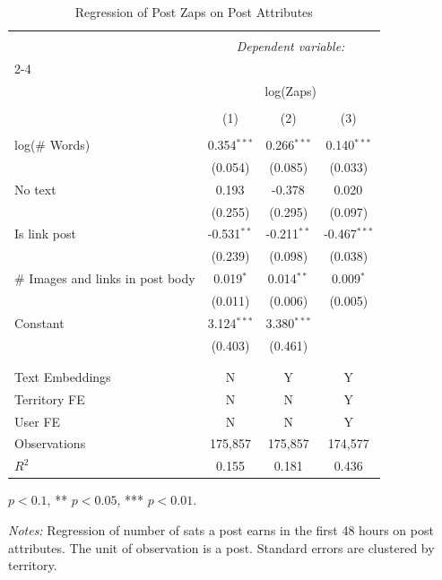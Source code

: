 \begin{table}[H]
\centering
\caption{Regression of Post Zaps on Post Attributes} \label{tbl_v4v_zreg}
\begin{threeparttable}
\begin{tabular}{@{\extracolsep{5pt}}lccc} 
\\[-1.8ex]\hline 
\hline \\[-1.8ex] 
 & \multicolumn{3}{c}{\textit{Dependent variable:}} \\ 
\cline{2-4} 
\\[-1.8ex] & \multicolumn{3}{c}{log(Zaps)} \\ 
\\[-1.8ex] & (1) & (2) & (3) \\ 
\hline \\[-1.8ex] 
log(\# Words)  & 0.354$^{***}$ & 0.266$^{***}$ & 0.140$^{***}$ \\
 & (0.054) & (0.085) & (0.033) \\
No text  & 0.193$^{}$ & -0.378$^{}$ & 0.020$^{}$ \\
 & (0.255) & (0.295) & (0.097) \\
Is link post  & -0.531$^{**}$ & -0.211$^{**}$ & -0.467$^{***}$ \\
 & (0.239) & (0.098) & (0.038) \\
\# Images and links in post body  & 0.019$^{*}$ & 0.014$^{**}$ & 0.009$^{*}$ \\
 & (0.011) & (0.006) & (0.005) \\
Constant  & 3.124$^{***}$ & 3.380$^{***}$ &  \\
 & (0.403) & (0.461) &  \\
& & & \\
\hline \\ [-1.8ex]
Text Embeddings         & N & Y & Y \\
Territory FE            & N & N & Y \\
User FE                 & N & N & Y \\
Observations  & 175,857 & 175,857 & 174,577 \\
$R^2$  & 0.155 & 0.181 & 0.436 \\ \hline \hline 
\end{tabular} 
\begin{tablenotes}[flushleft]\footnotesize
\item[] \parbox[t]{\linewidth}{%
\hfill * $p<0.1$, ** $p<0.05$, *** $p<0.01$.
}
\item \textit{Notes:} Regression of number of sats a post earns in the first 48 hours on post attributes. The unit of observation is a post. Standard errors are clustered by territory.
\end{tablenotes}
\end{threeparttable}
\end{table}
